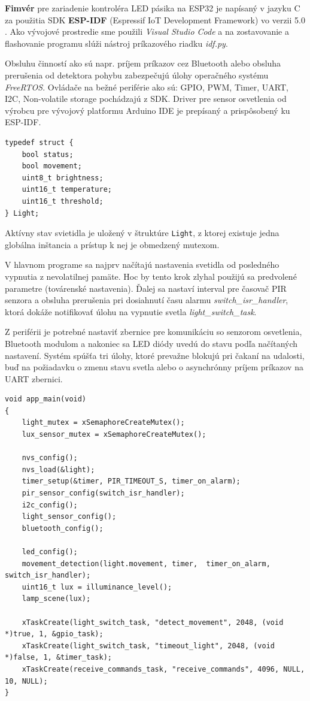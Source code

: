 \documentclass[12pt, a4paper]{article}
\begin{document}
\textbf{Fimvér} pre zariadenie kontroléra LED pásika na ESP32 je napísaný v jazyku C za použitia SDK \textbf{ESP-IDF} (Espressif IoT Development Framework) vo verzii 5.0 \cite{noauthor_esp-idf_nodate}. Ako vývojové prostredie sme použili \emph{Visual Studio Code} a na zostavovanie a flashovanie programu slúži nástroj príkazového riadku \emph{idf.py}. 

Obsluhu činností ako sú napr. príjem príkazov cez Bluetooth alebo obsluha prerušenia od detektora pohybu zabezpečujú úlohy operačného systému \emph{FreeRTOS}. Ovládače na bežné periférie ako sú: GPIO, PWM, Timer, UART, I2C, Non-volatile storage pochádzajú z SDK. Driver pre sensor osvetlenia od výrobcu pre vývojový platformu Arduino IDE je prepísaný a prispôsobený ku ESP-IDF.

\begin{lstlisting}[style=cstyle,caption=Štruktúra vlastností svietidla,label={lst:light-settings}]
typedef struct {
    bool status;
    bool movement;
    uint8_t brightness;
    uint16_t temperature;
    uint16_t threshold;
} Light;
\end{lstlisting}
Aktívny stav svietidla je uložený v štruktúre \verb|Light|, z ktorej existuje jedna globálna inštancia a prístup k nej je obmedzený
mutexom.

V hlavnom programe sa najprv načítajú nastavenia svetidla od posledného vypnutia z nevolatilnej pamäte. Hoc by tento krok zlyhal použijú sa predvolené parametre (továrenské nastavenia). Ďalej sa nastaví interval pre časovač PIR senzora a obsluha prerušenia pri dosiahnutí času alarmu \emph{switch\_isr\_handler}, ktorá dokáže notifikovať úlohu na vypnutie svetla \emph{light\_switch\_task}. 

Z periférii je potrebné nastaviť zbernice pre komunikáciu so senzorom osvetlenia, Bluetooth modulom a nakoniec sa LED diódy uvedú do stavu podľa načítaných nastavení. Systém spúšťa tri úlohy, ktoré prevažne blokujú pri čakaní na udalosti, buď na požiadavku o zmenu stavu svetla alebo o asynchrónny príjem príkazov na UART zbernici.

\begin{lstlisting}[style=cstyle,caption=Inicializácia hardvéru a spustenie úloh,label={lst:firmware-main},
 morekeywords={xTaskCreate,xSemaphoreCreateMutex,timer_on_alarm,switch_isr_handler,light_switch_task,receive_commands_task}]
void app_main(void)
{
    light_mutex = xSemaphoreCreateMutex();
    lux_sensor_mutex = xSemaphoreCreateMutex();

    nvs_config();  
    nvs_load(&light);
    timer_setup(&timer, PIR_TIMEOUT_S, timer_on_alarm);
    pir_sensor_config(switch_isr_handler);
    i2c_config(); 
    light_sensor_config();
    bluetooth_config();

	led_config();
    movement_detection(light.movement, timer,  timer_on_alarm, switch_isr_handler);
    uint16_t lux = illuminance_level();
    lamp_scene(lux);  

    xTaskCreate(light_switch_task, "detect_movement", 2048, (void *)true, 1, &gpio_task);
    xTaskCreate(light_switch_task, "timeout_light", 2048, (void *)false, 1, &timer_task);
    xTaskCreate(receive_commands_task, "receive_commands", 4096, NULL, 10, NULL);
}
\end{lstlisting}
\end{document}

